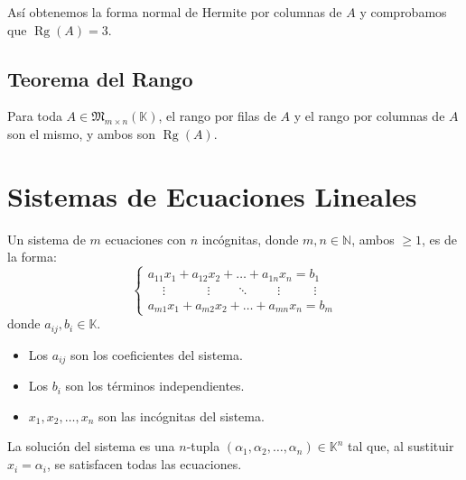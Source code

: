 \documentclass[a4paper,12pt]{article}
\begin{document}
\begin{ejemplo}[title=Ejemplo de cálculo del rango por filas]
Así obtenemos la forma normal de Hermite por columnas de $A$ y comprobamos que $\operatorname{Rg}(A)=3$.
\end{ejemplo}

\subsection{Teorema del Rango}

\begin{procedimiento}[title=Teorema del rango]
Para toda $A \in \mathfrak{M}_{m \times n}(\mathbb{K})$, el rango por filas de $A$ y el
rango por columnas de $A$ son el mismo, y ambos son $\operatorname{Rg}(A)$.
\end{procedimiento}

\section{Sistemas de Ecuaciones Lineales}

\begin{procedimiento}[title=Sistema de ecuaciones lineales]
Un sistema de $m$ ecuaciones con $n$ incógnitas, donde $m,n \in \mathbb{N}$, ambos $\ge 1$, es de la forma:
\[
\begin{cases}
a_{11}x_1 + a_{12}x_2 + \dots + a_{1n}x_n = b_1 \\
\,\,\,\,\,\,\,\vdots\,\,\,\,\,\,\,\,\,\,\,\,\,\,\,\,\,\,\,\,\vdots\,\,\,\,\,\,\,\,\,\,\,\,\ddots\,\,\,\,\,\,\,\,\,\,\,\,\,\vdots\,\,\,\,\,\,\,\,\,\,\,\,\,\,\,\,\vdots \\
a_{m1}x_1 + a_{m2}x_2 + \dots + a_{mn}x_n = b_m
\end{cases}
\]
donde $a_{ij}, b_i \in \mathbb{K}$.

\begin{itemize}
    \item Los $a_{ij}$ son los coeficientes del sistema.
    \item Los $b_i$ son los términos independientes.
    \item $x_1,x_2,\dots,x_n$ son las incógnitas del sistema.
\end{itemize}

La solución del sistema es una $n$-tupla $(\alpha_1,\alpha_2,\dots,\alpha_n) \in \mathbb{K}^n$ tal que, al sustituir $x_i=\alpha_i$, se satisfacen todas las ecuaciones.
\end{procedimiento}
\end{document}

